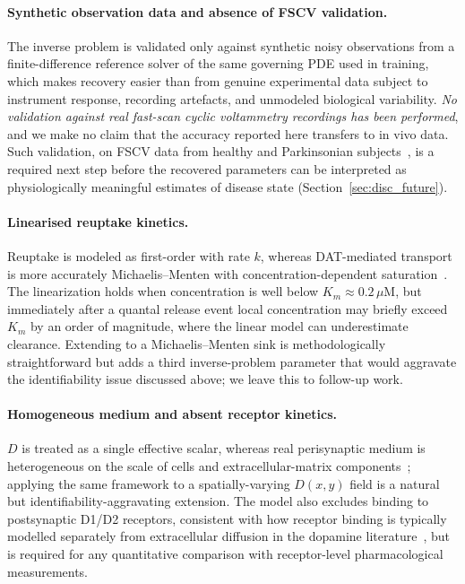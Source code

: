 \documentclass[12pt]{article}
\begin{document}
\paragraph{Synthetic observation data and absence of FSCV
validation.}
The inverse problem is validated only against synthetic noisy
observations from a finite-difference reference solver of the
same governing PDE used in training, which makes recovery
easier than from genuine experimental data subject to
instrument response, recording artefacts, and unmodeled
biological variability. \emph{No validation against real
fast-scan cyclic voltammetry recordings has been performed},
and we make no claim that the accuracy reported here transfers
to in vivo data. Such validation, on FSCV data from healthy and
Parkinsonian subjects~\cite{Rodeberg2017}, is a required next
step before the recovered parameters can be interpreted as
physiologically meaningful estimates of disease state
(Section~\ref{sec:disc_future}).

\paragraph{Linearised reuptake kinetics.}
Reuptake is modeled as first-order with rate $k$, whereas
DAT-mediated transport is more accurately Michaelis--Menten
with concentration-dependent saturation~\cite{Wiencke2020,
CraggRice2004}. The linearization holds when concentration is
well below $K_m \approx 0.2\,\mu$M, but immediately after a
quantal release event local concentration may briefly exceed
$K_m$ by an order of magnitude, where the linear model can
underestimate clearance. Extending to a Michaelis--Menten sink
is methodologically straightforward but adds a third
inverse-problem parameter that would aggravate the
identifiability issue discussed above; we leave this to
follow-up work.

\paragraph{Homogeneous medium and absent receptor kinetics.}
$D$ is treated as a single effective scalar, whereas real
perisynaptic medium is heterogeneous on the scale of cells and
extracellular-matrix components~\cite{CraggRice2004,
Nicholson1981}; applying the same framework to a
spatially-varying $D(x,y)$ field is a natural but
identifiability-aggravating extension. The model also excludes
binding to postsynaptic D1/D2 receptors, consistent with how
receptor binding is typically modelled separately from
extracellular diffusion in the dopamine
literature~\cite{Rice2008}, but is required for any
quantitative comparison with receptor-level pharmacological
measurements.
\end{document}

